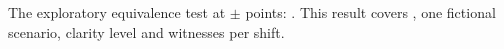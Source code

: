 The exploratory equivalence test at $\pm$\wtthProtocolMargin{} points: \wtthHaikuTostVerdictText.
This result covers \wtthDesignModelHaikuName{}, one fictional scenario, clarity level \wtthGateFrozenLevel{} and \wtthDesignLiveWitnessesWord{} witnesses per shift.
